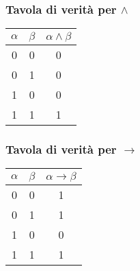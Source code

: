 \documentclass{article}
\theoremstyle{break}
\theoremstyle{break}
\theoremstyle{break}
\theoremstyle{break}
\begin{document}
\subsubsection{Tavola di verità per \texorpdfstring{\( \wedge \)}{AND} }
\begin{center}
  \begin{tabular}{c|c|c}
    \( \alpha \) & \( \beta \) & \( \alpha \wedge \beta \) \\
    \hline
    0            & 0           & 0                         \\
    0            & 1           & 0                         \\
    1            & 0           & 0                         \\
    1            & 1           & 1                         \\
  \end{tabular}
\end{center}

\subsubsection{Tavola di verità per \texorpdfstring{\( \to  \)}{->} }
\begin{center}
  \begin{tabular}{c|c|c}
    \( \alpha \) & \( \beta \) & \( \alpha \to \beta \) \\
    \hline
    0            & 0           & 1                      \\
    0            & 1           & 1                      \\
    1            & 0           & 0                      \\
    1            & 1           & 1                      \\
  \end{tabular}
\end{center}
\end{document}
